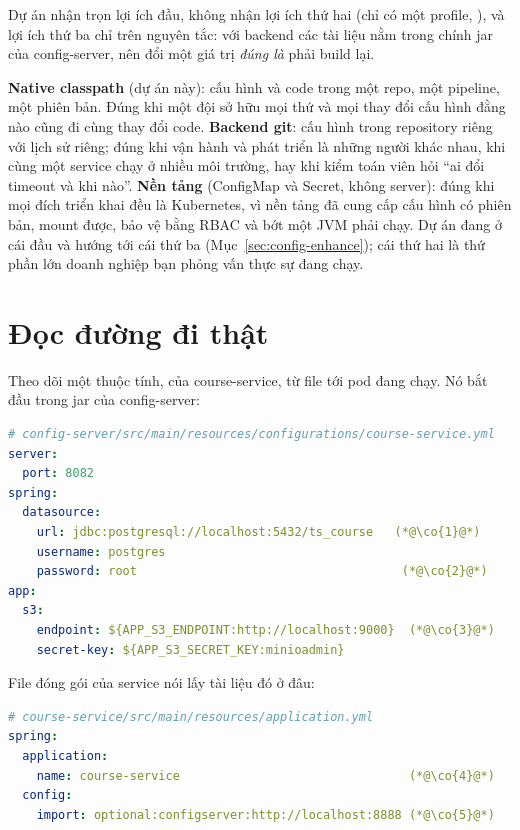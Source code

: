 Dự án nhận trọn lợi ích đầu, không nhận lợi ích thứ hai (chỉ có một
profile, ), và lợi ích thứ ba chỉ trên nguyên tắc: với
backend  các tài liệu nằm trong chính jar của
config-server, nên đổi một giá trị \emph{đúng là} phải build lại.

\begin{decision}
\textbf{Native classpath} (dự án này): cấu hình và code trong một repo,
một pipeline, một phiên bản. Đúng khi một đội sở hữu mọi thứ và mọi
thay đổi cấu hình đằng nào cũng đi cùng thay đổi code. \textbf{Backend
git}: cấu hình trong repository riêng với lịch sử riêng; đúng khi vận
hành và phát triển là những người khác nhau, khi cùng một service chạy
ở nhiều môi trường, hay khi kiểm toán viên hỏi ``ai đổi timeout và khi
nào''. \textbf{Nền tảng} (ConfigMap và Secret, không server): đúng khi
mọi đích triển khai đều là Kubernetes, vì nền tảng đã cung cấp cấu hình
có phiên bản, mount được, bảo vệ bằng RBAC và bớt một JVM phải chạy. Dự
án đang ở cái đầu và hướng tới cái thứ ba
(Mục~\ref{sec:config-enhance}); cái thứ hai là thứ phần lớn doanh
nghiệp bạn phỏng vấn thực sự đang chạy.
\end{decision}

\section{Đọc đường đi thật}

Theo dõi một thuộc tính,  của
course-service, từ file tới pod đang chạy. Nó bắt đầu trong jar của
config-server:

\begin{lstlisting}[language=yaml]
# config-server/src/main/resources/configurations/course-service.yml
server:
  port: 8082
spring:
  datasource:
    url: jdbc:postgresql://localhost:5432/ts_course   (*@\co{1}@*)
    username: postgres
    password: root                                     (*@\co{2}@*)
app:
  s3:
    endpoint: ${APP_S3_ENDPOINT:http://localhost:9000}  (*@\co{3}@*)
    secret-key: ${APP_S3_SECRET_KEY:minioadmin}
\end{lstlisting}

File  đóng gói của service nói lấy tài liệu đó ở
đâu:

\begin{lstlisting}[language=yaml]
# course-service/src/main/resources/application.yml
spring:
  application:
    name: course-service                                (*@\co{4}@*)
  config:
    import: optional:configserver:http://localhost:8888 (*@\co{5}@*)
\end{lstlisting}

